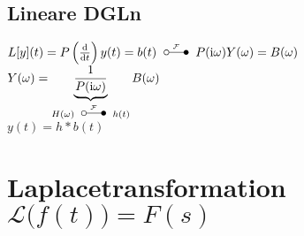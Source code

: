 \documentclass[german,color]{latex4ei/latex4ei_fs}
\begin{document}
\begin{sectionbox}
	\subsection{Lineare DGLn}
	$L[y](t) = P\left(\frac{\diff}{\diff t}\right)y(t) = b(t) \FT P(\i \omega)Y(\omega) = B(\omega)$\\
	$Y(\omega) = \underbrace{\frac{1}{P(\i \omega)}}_{H(\omega) \FT h(t)}B(\omega)$\\
	$y(t) = h*b(t)$
\end{sectionbox}



\section{Laplacetransformation \quad $\mathcal L\bigl(f(t)\bigr) = F(s)$}
\end{document}
